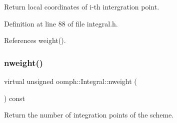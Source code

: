 Return local coordinates of i-\/th intergration point. 



Definition at line 88 of file integral.\+h.



References weight().

\mbox{\label{classoomph_1_1Integral_a1a270de9d99a1fcf1d25a6c1017f65fa}} 
\subsubsection{\texorpdfstring{nweight()}{nweight()}}
{\footnotesize\ttfamily virtual unsigned oomph\+::\+Integral\+::nweight (\begin{DoxyParamCaption}{ }\end{DoxyParamCaption}) const\hspace{0.3cm}{\ttfamily [pure virtual]}}



Return the number of integration points of the scheme. 



